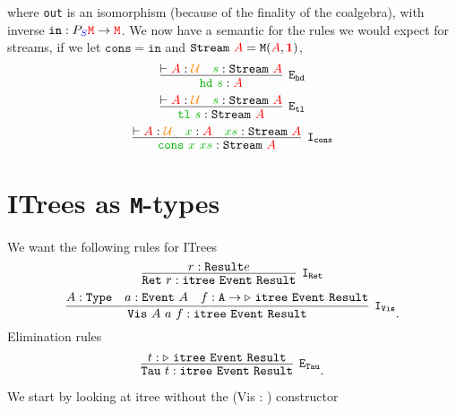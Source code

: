 \documentclass[twoside,11pt,openright]{report}
\newcommand*{\term}[1]{\textcolor{green!70!black}{#1}}
\newcommand*{\type}[1]{\textcolor{red}{#1}}
\newcommand*{\container}[1]{\textcolor{blue}{#1}}
\newcommand*{\universe}[1]{\textcolor{orange}{#1}}
\newcommand*{\unit}{\type{\textbf{1}}}
\begin{document}
where \texttt{out} is an isomorphism (because of the finality of the coalgebra), with inverse \(\mathtt{in} : P_{\container{S}}\type{\mathtt{M}} \rightarrow \type{\mathtt{M}}\). We now have a semantic for the rules we would expect for streams, if we let \(\mathtt{cons} = \mathtt{in}\) and \(\mathtt{Stream}~\type{A} = \mathtt{M}(\type{A},\unit)\),
\begin{equation}
  \infer[\mathtt{E}_{\mathtt{hd}}]{\term{\mathtt{hd}}~\term{s} : \type{A}}{\vdash \type{A} : \universe{\mathcal{U}} & \term{s} : \mathtt{Stream}~\type{A}}
\end{equation}
\begin{equation}
  \infer[\mathtt{E}_{\mathtt{tl}}]{\term{\mathtt{tl}}~\term{s} : \mathtt{Stream}~\type{A}}{\vdash \type{A} : \universe{\mathcal{U}} & \term{s} : \mathtt{Stream}~\type{A}}
\end{equation}
\begin{equation}
  \infer[\mathtt{I}_{\mathtt{cons}}]{\term{\mathtt{cons}}~\term{x}~\term{xs} : \mathtt{Stream}~\type{A}}{\vdash \type{A} : \universe{\mathcal{U}} & \term{x} : \type{A} & \term{xs} : \mathtt{Stream}~\type{A}}
\end{equation}

\section{ITrees as \texttt{M}-types}
We want the following rules for ITrees
\begin{equation}
  \infer [\mathtt{I}_\mathtt{Ret}]{\mathtt{Ret}~r : \mathtt{itree}~\mathtt{Event}~\mathtt{Result}}{r : \mathtt{Result}e}
\end{equation}
\begin{equation}
  \infer[\mathtt{I}_\mathtt{Vis}]{\mathtt{Vis}~A~a~f : \mathtt{itree}~\mathtt{Event}~\mathtt{Result}}{A : \mathtt{Type} & a : \mathtt{Event}~A & f : \mathtt{A} \rightarrow \triangleright~\mathtt{itree}~\mathtt{Event}~\mathtt{Result}}.
\end{equation}
Elimination rules
\begin{equation}
  \infer[\mathtt{E}_\mathtt{Tau}]{\mathtt{Tau}~t : \mathtt{itree}~\mathtt{Event}~\mathtt{Result}}{t : \triangleright~\mathtt{itree}~\mathtt{Event}~\mathtt{Result}}.
\end{equation}

We start by looking at itree without the (Vis : ) constructor


\end{document}
